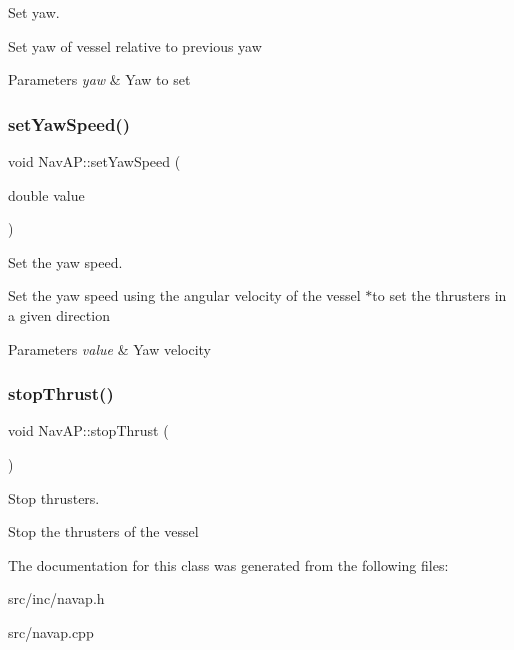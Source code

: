 Set yaw. 

Set yaw of vessel relative to previous yaw 
\begin{DoxyParams}{Parameters}
{\em yaw} & Yaw to set \\
\hline
\end{DoxyParams}
\mbox{\label{classNavAP_acc70dd131f7601bf4b1dff866db44119}} 
\subsubsection{\texorpdfstring{set\+Yaw\+Speed()}{setYawSpeed()}}
{\footnotesize\ttfamily void Nav\+A\+P\+::set\+Yaw\+Speed (\begin{DoxyParamCaption}\item[{double}]{value }\end{DoxyParamCaption})\hspace{0.3cm}{\ttfamily [private]}}



Set the yaw speed. 

Set the yaw speed using the angular velocity of the vessel $\ast$to set the thrusters in a given direction 
\begin{DoxyParams}{Parameters}
{\em value} & Yaw velocity \\
\hline
\end{DoxyParams}
\mbox{\label{classNavAP_a5070e1a7fd9a3a118acf7345a6bcbdd4}} 
\subsubsection{\texorpdfstring{stop\+Thrust()}{stopThrust()}}
{\footnotesize\ttfamily void Nav\+A\+P\+::stop\+Thrust (\begin{DoxyParamCaption}{ }\end{DoxyParamCaption})\hspace{0.3cm}{\ttfamily [private]}}



Stop thrusters. 

Stop the thrusters of the vessel 

The documentation for this class was generated from the following files\+:\begin{DoxyCompactItemize}
\item 
src/inc/navap.\+h\item 
src/navap.\+cpp\end{DoxyCompactItemize}
